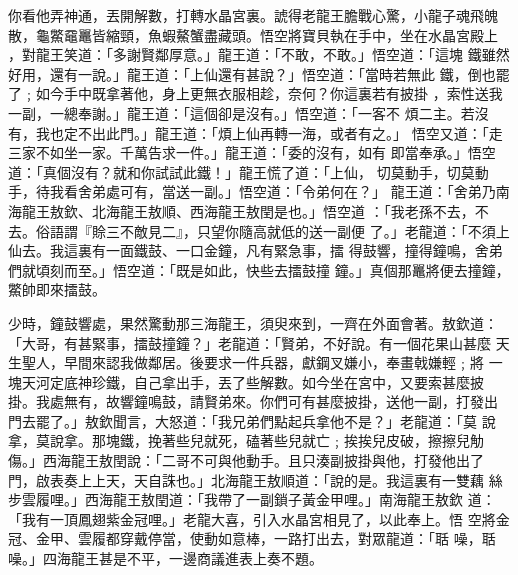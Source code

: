 \begin{pinyinscope}
{你看他弄神通，丟開解數，打轉水晶宮裏。諕得老龍王膽戰心驚，小龍子魂飛魄
散，龜鱉黿鼉皆縮頸，魚蝦鰲蟹盡藏頭。悟空將寶貝執在手中，坐在水晶宮殿上
，對龍王笑道：「多謝賢鄰厚意。」龍王道：「不敢，不敢。」悟空道：「這塊
鐵雖然好用，還有一說。」龍王道：「上仙還有甚說？」悟空道：「當時若無此
鐵，倒也罷了﹔如今手中既拿著他，身上更無衣服相趁，奈何？你這裏若有披掛
，索性送我一副，一總奉謝。」龍王道：「這個卻是沒有。」悟空道：「一客不
煩二主。若沒有，我也定不出此門。」龍王道：「煩上仙再轉一海，或者有之。」
悟空又道：「走三家不如坐一家。千萬告求一件。」龍王道：「委的沒有，如有
即當奉承。」悟空道：「真個沒有？就和你試試此鐵！」龍王慌了道：「上仙，
切莫動手，切莫動手，待我看舍弟處可有，當送一副。」悟空道：「令弟何在？」
龍王道：「舍弟乃南海龍王敖欽、北海龍王敖順、西海龍王敖閏是也。」悟空道
：「我老孫不去，不去。俗語謂『賒三不敵見二』，只望你隨高就低的送一副便
了。」老龍道：「不須上仙去。我這裏有一面鐵鼓、一口金鐘，凡有緊急事，擂
得鼓響，撞得鐘鳴，舍弟們就頃刻而至。」悟空道：「既是如此，快些去擂鼓撞
鐘。」真個那鼉將便去撞鐘，鱉帥即來擂鼓。

少時，鐘鼓響處，果然驚動那三海龍王，須臾來到，一齊在外面會著。敖欽道：
「大哥，有甚緊事，擂鼓撞鐘？」老龍道：「賢弟，不好說。有一個花果山甚麼
天生聖人，早間來認我做鄰居。後要求一件兵器，獻鋼叉嫌小，奉畫戟嫌輕﹔將
一塊天河定底神珍鐵，自己拿出手，丟了些解數。如今坐在宮中，又要索甚麼披
掛。我處無有，故響鐘鳴鼓，請賢弟來。你們可有甚麼披掛，送他一副，打發出
門去罷了。」敖欽聞言，大怒道：「我兄弟們點起兵拿他不是？」老龍道：「莫
說拿，莫說拿。那塊鐵，挽著些兒就死，磕著些兒就亡﹔挨挨兒皮破，擦擦兒觔
傷。」西海龍王敖閏說：「二哥不可與他動手。且只湊副披掛與他，打發他出了
門，啟表奏上上天，天自誅也。」北海龍王敖順道：「說的是。我這裏有一雙藕
絲步雲履哩。」西海龍王敖閏道：「我帶了一副鎖子黃金甲哩。」南海龍王敖欽
道：「我有一頂鳳翅紫金冠哩。」老龍大喜，引入水晶宮相見了，以此奉上。悟
空將金冠、金甲、雲履都穿戴停當，使動如意棒，一路打出去，對眾龍道：「聒
噪，聒噪。」四海龍王甚是不平，一邊商議進表上奏不題。

}
\end{pinyinscope}
